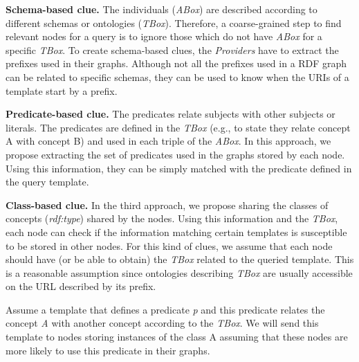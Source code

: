 \medskip

\noindent\textbf{Schema-based clue.}
The individuals (\emph{ABox}) are described according to different schemas or ontologies (\emph{TBox}).
Therefore, a coarse-grained step to find relevant nodes for a query is to ignore those which do not have \emph{ABox} for a specific \emph{TBox}.
To create schema-based clues, the \emph{Providers} have to extract the prefixes used in their graphs.
Although not all the prefixes used in a RDF graph can be related to specific schemas,
they can be used to know when the URIs of a template start by a prefix.

\medskip

\noindent\textbf{Predicate-based clue.}
The predicates relate subjects with other subjects or literals.
The predicates are defined in the \emph{TBox} (e.g., to state they relate concept A with concept B) and used in each triple of the \emph{ABox}.
In this approach, we propose extracting the set of predicates used in the graphs stored by each node.
Using this information, they can be simply matched with the predicate defined in the query template.

\medskip

\noindent\textbf{Class-based clue.}
In the third approach, we propose sharing the classes of concepts (\textit{rdf:type}) shared by the nodes.
Using this information and the \emph{TBox}, each node can check if the information matching certain templates is susceptible to be stored in other nodes.
For this kind of clues, we assume that each node should have (or be able to obtain) the \emph{TBox} related to the queried template.
This is a reasonable assumption since ontologies describing \emph{TBox} are usually accessible on the URL described by its prefix.

Assume a template that defines a predicate \emph{p} and this predicate relates the concept \emph{A} with another concept according to the \emph{TBox}.
We will send this template to nodes storing instances of the class A assuming that these nodes are more likely to use this predicate in their graphs.



